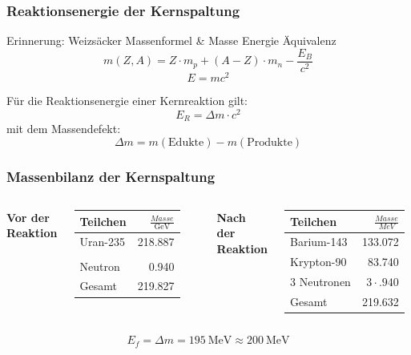 \documentclass{beamer}[9pt]
\begin{document}
\begin{frame}
\frametitle{Reaktionsenergie der Kernspaltung}

\begin{block}{Erinnerung: Weizsäcker Massenformel \& Masse Energie Äquivalenz}
\[
m(Z,A) = Z \cdot m_p + (A-Z)\cdot m_n - \frac{E_B}{c^2}
\]
\[
E = mc^2
\]
\end{block}

Für die Reaktionsenergie einer Kernreaktion gilt:
\[
E_R = \Delta m \cdot c^2
\]
mit dem Massendefekt:
\[
\Delta m = m(\mathrm {Edukte})-m(\mathrm{Produkte})
\]
\end{frame}

\begin{frame}
\frametitle{Massenbilanz der Kernspaltung}

\centering
\begin{columns}
\centering
{}


\textbf{Vor der Reaktion}

\vspace*{0.5cm}
\begin{tabular}{lr}
\toprule
	Teilchen & $\frac{Masse}{\si{\giga\eV}}$ \\
\midrule	
	Uran-235 & \num{218.887}\\
	\\
	Neutron & \num{.940}\\
	\midrule
	Gesamt & 219.827\\
	\bottomrule
	
\end{tabular}

\centering
\textbf{Nach der Reaktion}

\vspace*{0.5cm}
\begin{tabular}{lr}
\toprule
	Teilchen & $\frac{Masse}{MeV}$ \\
\midrule	
	Barium-143 & \num{133.072}\\
	Krypton-90 & \num{83.740}\\
	3 Neutronen & $3 \cdot\num{.940}$\\ 
	\midrule
	Gesamt & \num{219.632}\\
	\bottomrule
\end{tabular}
\end{columns}
\vspace{0.5cm}
\[
E_f = \Delta m = \SI{195}{\MeV} \approx  \SI{200}{\MeV} 
\]
\end{frame}
\end{document}

